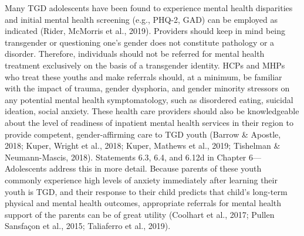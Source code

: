 \documentclass[
]{book}
\begin{document}
Many TGD adolescents have been found to
experience mental health disparities and initial
mental health screening (e.g., PHQ-2, GAD) can
be employed as indicated (Rider, McMorris et al.,
2019). Providers should keep in mind being
transgender or questioning one's gender does not
constitute pathology or a disorder. Therefore,
individuals should not be referred for mental
health treatment exclusively on the basis of a
transgender identity. HCPs and MHPs who treat
these youths and make referrals should, at a minimum, be familiar with the impact of trauma,
gender dysphoria, and gender minority stressors
on any potential mental health symptomatology,
such as disordered eating, suicidal ideation, social
anxiety. These health care providers should also
be knowledgeable about the level of readiness of
inpatient mental health services in their region
to provide competent, gender-affirming care to
TGD youth (Barrow \& Apostle, 2018; Kuper,
Wright et al., 2018; Kuper, Mathews et al., 2019;
Tishelman \& Neumann-Mascis, 2018). Statements
6.3, 6.4, and 6.12d in Chapter 6---Adolescents
address this in more detail. Because parents of
these youth commonly experience high levels of
anxiety immediately after learning their youth is
TGD, and their response to their child predicts
that child's long-term physical and mental health
outcomes, appropriate referrals for mental health
support of the parents can be of great utility
(Coolhart et al., 2017; Pullen Sansfaçon et al.,
2015; Taliaferro et al., 2019).
\end{document}
